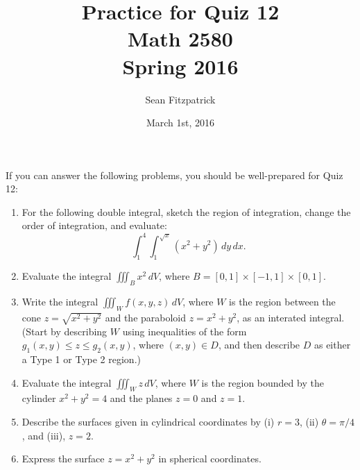 \documentclass[letterpaper,12pt]{article}
\title{Practice for Quiz 12\\Math 2580\\Spring 2016}
\author{Sean Fitzpatrick}
\date{March 1st, 2016}
\newcommand{\di}{\displaystyle}
\begin{document}
 \maketitle

If you can answer the following problems, you should be well-prepared for Quiz 12:



\begin{enumerate}
 \item For the following double integral, sketch the region of integration, change the order of integration, and evaluate:
\[
 \int_1^4\int_1^{\sqrt{x}}(x^2+y^2)\,dy\,dx.
\]
 \item Evaluate the integral $\di \iiint_B x^2\,dV$, where $B=[0,1]\times [-1,1]\times [0,1]$.
 \item Write the integral $\di \iiint_W f(x,y,z)\,dV$, where $W$ is the region between the cone $z=\sqrt{x^2+y^2}$ and the paraboloid $z=x^2+y^2$, as an interated integral. (Start by describing $W$ using inequalities of the form $g_1(x,y)\leq z\leq g_2(x,y)$, where $(x,y)\in D$, and then describe $D$ as either a Type 1 or Type 2 region.)

 \item Evaluate the integral $\di \iiint_W z\,dV$, where $W$ is the region bounded by the cylinder $x^2+y^2=4$ and the planes $z=0$ and $z=1$.

 \item Describe the surfaces given in cylindrical coordinates by (i) $r=3$, (ii) $\theta = \pi/4$, and (iii), $z=2$.
 \item Express the surface $z=x^2+y^2$ in spherical coordinates.
 \end{enumerate}
\end{document}
